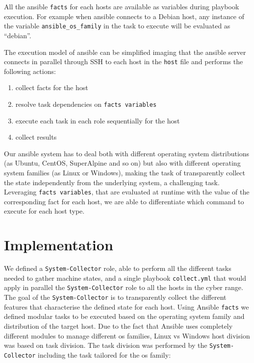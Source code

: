 \documentclass[11pt]{article}
\begin{document}
All the ansible {\tt facts} for each hosts are available as variables during playbook execution. For example when ansible connects to a Debian host, any instance of the variable {\tt ansible\_os\_family} in the task to execute will be evaluated as ``debian''.

\bigskip
The execution model of ansible can be simplified imaging that the ansible server connects in parallel through SSH to each host in the {\tt host} file and performs the following actions:

\begin{enumerate}
\item collect facts for the host
\item resolve task dependencies on {\tt facts variables}
\item execute each task in each role sequentially for the host
\item collect results
\end{enumerate}

\bigskip
Our ansible system has to deal both with different operating system distributions (as Ubuntu, CentOS, SuperAlpine and so on) but also with different operating system families (as Linux or Windows), making the task of transparently collect the state independently from the underlying system, a challenging task. 
 Leveraging {\tt facts variables}, that are evaluated at runtime with the value of the corresponding fact for each host, we are able to differentiate which command to execute for each host type. 


\section{Implementation}
We defined a {\tt System-Collector} role, able to perform all the different tasks needed to gather machine states, and a single playbook {\tt collect.yml} that would apply in parallel the {\tt System-Collector} role to all the hosts in the cyber range.  
The goal of the {\tt System-Collector} is to transparently collect the different features that characterise the defined state for each host. Using Ansible {\tt facts} we defined modular tasks to be executed based on the operating system family and distribution of the target host. Due to the fact that Ansible uses completely different modules to manage different os families, Linux vs Windows host division was based on task division. The task division was performed by the {\tt System-Collector} including the task tailored for the os family:
\end{document}
